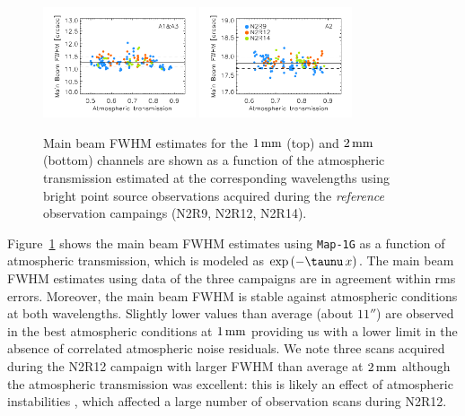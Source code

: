 \begin{figure}[!thbp]
\begin{center}
  \includegraphics[clip, width=0.4\textwidth]{Figures/plot_FWHM_vs_atmtrans_mb_radius_binning2_1mm.pdf}
  \includegraphics[clip, width=0.4\textwidth]{Figures/plot_FWHM_vs_atmtrans_mb_radius_binning2_a2.pdf}
  \caption[Main Beam FWHM]{Main beam FWHM estimates for the
    $1\,\rm{mm}$ (top) and $2\,\rm{mm}$ (bottom) channels are shown as
    a function of the atmospheric transmission estimated at the
    corresponding wavelengths using bright point source observations
  acquired during the \emph{reference} observation campaings (N2R9, N2R12, N2R14).}
\label{fig:fwhm_map_atmtrans}
\end{center}
\end{figure}

Figure~\ref{fig:fwhm_map_atmtrans} shows the main beam FWHM estimates
using {\tt Map-1G} as a function of atmospheric transmission,
which is modeled as $\exp{\left(-\taunu \, x\right)}$. %
The main beam FWHM estimates using data of the three campaigns are in
agreement within rms errors. Moreover, the main beam FWHM is stable
against atmospheric conditions at both wavelengths. Slightly lower
values than average (about $11''$) are observed in the best
atmospheric conditions at $1\,\rm{mm}$ providing us with a lower limit
in the absence of correlated atmospheric noise residuals. We note
three scans acquired during the N2R12 campaign with larger FWHM than average at
$2\,\rm{mm}$ although the atmospheric transmission was excellent: this
is likely an effect of atmospheric instabilities%
, which affected a large number of observation scans during N2R12. 



